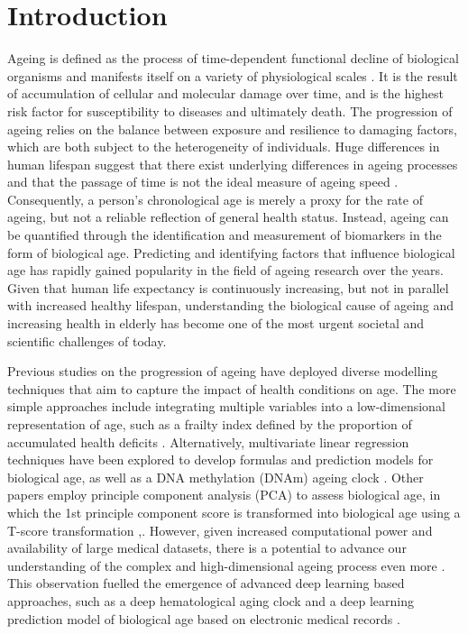 \chapter{Introduction}\label{chap:introduction}
Ageing is defined as the process of time-dependent functional decline of biological organisms and manifests itself on a variety of physiological scales \cite{lopez2013hallmarks}. It is the result of accumulation of cellular and molecular damage over time, and is the highest risk factor for susceptibility to diseases and ultimately death. The progression of ageing relies on the balance between exposure and resilience to damaging factors, which are both subject to the heterogeneity of individuals. Huge differences in human lifespan suggest that there exist underlying differences in ageing processes and that the passage of time is not the ideal measure of ageing speed \cite{sprott2010biomarkers}. Consequently, a person's chronological age is merely a proxy for the rate of ageing, but not a reliable reflection of general health status. Instead, ageing can be quantified through the identification and measurement of biomarkers in the form of biological age. Predicting and identifying factors that influence biological age has rapidly gained popularity in the field of ageing research over the years. Given that human life expectancy is continuously increasing, but not in parallel with increased healthy lifespan, understanding the biological cause of ageing and increasing health in elderly has become one of the most urgent societal and scientific challenges of today.

Previous studies on the progression of ageing have deployed diverse modelling techniques that aim to capture the impact of health conditions on age. The more simple approaches include integrating multiple variables into a low-dimensional representation of age, such as a frailty index defined by the proportion of accumulated health deficits \cite{mitnitski2001accumulation}. Alternatively, multivariate linear regression techniques have been explored to develop formulas \cite{levine2013modeling} and prediction models \cite{bae2008development} for biological age, as well as a DNA methylation (DNAm) ageing clock \cite{horvath2013dna}. Other papers employ principle component analysis (PCA) to assess biological age, in which the 1st principle component score is transformed into biological age using a T-score transformation \cite{nakamura1988assessment},\cite{park2009developing}. However, given increased computational power and availability of large medical datasets, there is a potential to advance our understanding of the complex and high-dimensional ageing process even more \cite{farrell2021potential}. This observation fuelled the emergence of advanced deep learning based approaches, such as a deep hematological aging clock  and a deep learning prediction model of biological age based on electronic medical records \cite{wang2017predicting}. 

